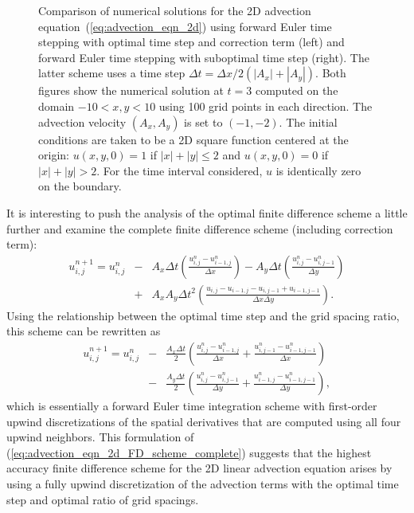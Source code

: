 \documentclass[fleqn,12pt,twoside]{article}
\newcommand{\bea}{\begin{eqnarray}}
\newcommand{\eea}{\end{eqnarray}}
\def\dt{\Delta t}
\def\dx{\Delta x}
\def\dy{\Delta y}
\begin{document}
\begin{figure}[tb]
\begin{center}
\caption{Comparison of numerical solutions for the 2D advection
equation~(\ref{eq:advection_eqn_2d}) using forward Euler time stepping 
with optimal time step and correction term (left) and forward Euler time 
stepping with suboptimal time step (right).  The latter scheme uses a 
time step $\Delta t = \Delta x / 2 (|A_x|+|A_y|)$.  
Both figures show the numerical solution at $t = 3$ computed on the domain 
$-10 < x,y < 10$ using 100 grid points in each direction.
The advection velocity $(A_x, A_y)$ is set to $(-1, -2)$.  The initial 
conditions are taken to be a 2D square function centered at the
origin: $u(x,y,0) = 1$ if $|x| + |y| \le 2$ and 
$u(x,y,0) = 0$ if $|x| + |y| > 2$. 
For the time interval considered, $u$ is identically zero 
on the boundary.
}
\label{fig:advection_eqn_2d_soln}
\end{center}
\end{figure}

It is interesting to push the analysis of the optimal finite difference 
scheme a little further and examine the complete finite difference scheme
(including correction term):
\bea
  u^{n+1}_{i,j} = u^{n}_{i,j}
  &-& A_x \dt \left( \frac{u^{n}_{i,j} - u^{n}_{i-1,j}}{\dx} \right)
  - A_y \dt \left( \frac{u^{n}_{i,j} - u^{n}_{i,j-1}}{\dy} \right)
  \nonumber \\
  &+& A_x A_y \dt^2 
        \left( \frac{u_{i,j} - u_{i-1,j} - u_{i,j-1} + u_{i-1,j-1}}
                    {\dx \dy} 
        \right).
  \label{eq:advection_eqn_2d_FD_scheme_complete}
\eea
Using the relationship between the optimal time step and the grid spacing
ratio, this scheme can be rewritten as
\bea
  u^{n+1}_{i,j} = u^{n}_{i,j}
  &-& \frac{A_x \dt}{2}
    \left( \frac{u^{n}_{i,j} - u^{n}_{i-1,j}}{\dx} 
         + \frac{u^{n}_{i,j-1} - u^{n}_{i-1,j-1}}{\dx} 
    \right)
  \nonumber \\
  &-& \frac{A_y \dt}{2}
    \left( \frac{u^{n}_{i,j} - u^{n}_{i,j-1}}{\dy} 
         + \frac{u^{n}_{i-1,j} - u^{n}_{i-1,j-1}}{\dy} 
    \right),
  \label{eq:advection_eqn_2d_FD_scheme_simplified}
\eea
which is essentially a forward Euler time integration scheme with 
first-order upwind discretizations of the spatial derivatives that are 
computed using all four upwind neighbors.  This formulation of 
(\ref{eq:advection_eqn_2d_FD_scheme_complete}) suggests that the highest
accuracy finite difference scheme for the 2D linear advection equation arises
by using a fully upwind discretization of the advection terms with the 
optimal time step and optimal ratio of grid spacings.
\end{document}
